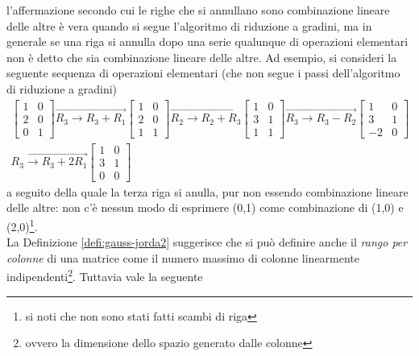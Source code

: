 \begin{oss}
  \label{oss:gauss-jorda3}
  l'affermazione secondo cui le righe che si annullano sono combinazione
  lineare delle altre è vera quando si segue l'algoritmo di riduzione
  a gradini, ma in generale se una riga si annulla dopo una serie
  qualunque di operazioni elementari non è detto che sia combinazione
  lineare delle altre. Ad esempio, si consideri la seguente sequenza di
  operazioni elementari (che non segue i passi dell'algoritmo di
  riduzione a gradini)
  \begin{eqnarray*}
    \begin{bmatrix}
      1 & 0\\
      2 & 0\\
      0 & 1
    \end{bmatrix} \overrightarrow{
      R_3\to R_3+R_1
    }
    \begin{bmatrix}
      1 & 0 \\
      2 & 0 \\
      1 & 1
    \end{bmatrix}
    \overrightarrow{R_2\to R_2+R_3}
    \begin{bmatrix}
      1 & 0\\
      3 & 1\\
      1 & 1
    \end{bmatrix}\overrightarrow{R_3\to R_3-R_2}
    \begin{bmatrix}
      1 & 0 \\
      3 & 1 \\
      -2 & 0
    \end{bmatrix}\\
    \overrightarrow{R_3\to R_3+2R_1}
    \begin{bmatrix}
      1 & 0\\
      3 & 1\\
      0 & 0
    \end{bmatrix}
  \end{eqnarray*}
  a seguito della quale la terza riga si anulla, pur non essendo
  combinazione lineare delle altre: non c'è nessun modo di esprimere
  (0,1) come combinazione di (1,0) e (2,0)\footnote{si noti che non sono
    stati fatti scambi di riga}.\\
  La Definizione \ref{defi:gauss-jorda2} suggerisce che si può definire
  anche il \textit{rango per colonne} di una matrice come il numero
  massimo di colonne linearmente indipendenti\footnote{ovvero la
    dimensione dello spazio generato dalle colonne}. Tuttavia vale la
  seguente
\end{oss}

